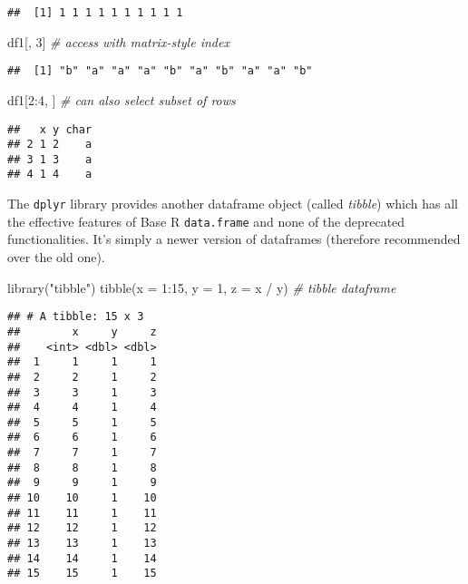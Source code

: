 \documentclass[
  oneside]{book}
\newenvironment{Shaded}{\begin{snugshade}}{\end{snugshade}}
\newcommand{\AttributeTok}[1]{\textcolor[rgb]{0.77,0.63,0.00}{#1}}
\newcommand{\CommentTok}[1]{\textcolor[rgb]{0.56,0.35,0.01}{\textit{#1}}}
\newcommand{\DecValTok}[1]{\textcolor[rgb]{0.00,0.00,0.81}{#1}}
\newcommand{\FunctionTok}[1]{\textcolor[rgb]{0.00,0.00,0.00}{#1}}
\newcommand{\NormalTok}[1]{#1}
\newcommand{\SpecialCharTok}[1]{\textcolor[rgb]{0.00,0.00,0.00}{#1}}
\newcommand{\StringTok}[1]{\textcolor[rgb]{0.31,0.60,0.02}{#1}}
\begin{document}
\begin{verbatim}
##  [1] 1 1 1 1 1 1 1 1 1 1
\end{verbatim}

\begin{Shaded}
\begin{Highlighting}[]
\NormalTok{df1[, }\DecValTok{3}\NormalTok{] }\CommentTok{\# access with matrix{-}style index}
\end{Highlighting}
\end{Shaded}

\begin{verbatim}
##  [1] "b" "a" "a" "a" "b" "a" "b" "a" "a" "b"
\end{verbatim}

\begin{Shaded}
\begin{Highlighting}[]
\NormalTok{df1[}\DecValTok{2}\SpecialCharTok{:}\DecValTok{4}\NormalTok{, ] }\CommentTok{\# can also select subset of rows}
\end{Highlighting}
\end{Shaded}

\begin{verbatim}
##   x y char
## 2 1 2    a
## 3 1 3    a
## 4 1 4    a
\end{verbatim}

The \texttt{dplyr} library provides another dataframe object (called \emph{tibble}) which has all
the effective features of Base R \texttt{data.frame} and none of the
deprecated functionalities. It's simply a newer version of dataframes (therefore
recommended over the old one).

\begin{Shaded}
\begin{Highlighting}[]
\FunctionTok{library}\NormalTok{(}\StringTok{"tibble"}\NormalTok{)}
\FunctionTok{tibble}\NormalTok{(}\AttributeTok{x =} \DecValTok{1}\SpecialCharTok{:}\DecValTok{15}\NormalTok{, }\AttributeTok{y =} \DecValTok{1}\NormalTok{, }\AttributeTok{z =}\NormalTok{ x }\SpecialCharTok{/}\NormalTok{ y) }\CommentTok{\# tibble dataframe}
\end{Highlighting}
\end{Shaded}

\begin{verbatim}
## # A tibble: 15 x 3
##        x     y     z
##    <int> <dbl> <dbl>
##  1     1     1     1
##  2     2     1     2
##  3     3     1     3
##  4     4     1     4
##  5     5     1     5
##  6     6     1     6
##  7     7     1     7
##  8     8     1     8
##  9     9     1     9
## 10    10     1    10
## 11    11     1    11
## 12    12     1    12
## 13    13     1    13
## 14    14     1    14
## 15    15     1    15
\end{verbatim}
\end{document}
